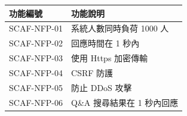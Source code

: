 \documentclass{report}
\begin{document}
\begin{tabularx}{\textwidth}{
  |p{}%
  |p{}|%
}
  \hline
  功能編號 &  功能說明 \\ \hline
  SCAF-NFP-01 & 系統人數同時負荷 1000 人 \\ \hline
  SCAF-NFP-02 & 回應時間在 1 秒內 \\ \hline
  SCAF-NFP-03 & 使用 Https 加密傳輸 \\ \hline
  SCAF-NFP-04 & CSRF 防護 \\ \hline
  SCAF-NFP-05 & 防止 DDoS 攻擊 \\ \hline
  SCAF-NFP-06 & Q\&A 搜尋結果在 1 秒內回應 \\ \hline
\end{tabularx}
\end{document}
